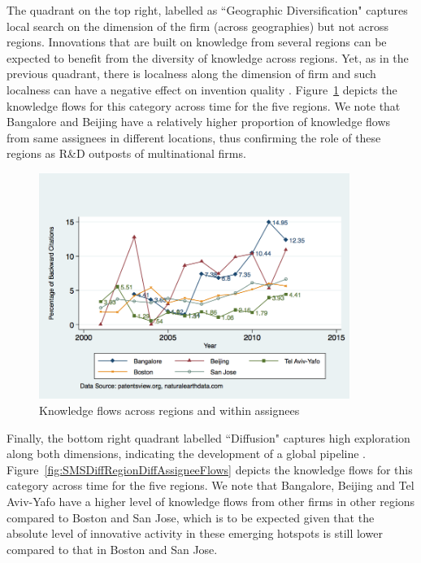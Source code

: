\documentclass[12pt,letterpaper]{article}
\begin{document}
The quadrant on the top right, labelled as ``Geographic Diversification" captures local search on the dimension of the firm (across geographies) but not across regions. Innovations that are built on knowledge from several regions can be expected to benefit from the diversity of knowledge across regions. Yet, as in the previous quadrant, there is localness along the dimension of firm and such localness can have a negative effect on invention quality \citep{Rosenkopf2001}. Figure~\ref{fig:SMSDiffRegionSameAssigneeFlows} depicts the  knowledge flows for this category across time for the five regions. We note that Bangalore and Beijing have a relatively higher proportion of knowledge flows from same assignees in different locations, thus confirming the role of these regions as R\&D outposts of multinational firms.\par

\begin{figure}[h!]
\begin{centering}
  \caption{Knowledge flows across regions and within assignees}
  \label{fig:SMSDiffRegionSameAssigneeFlows}
  \includegraphics[width=0.90\textwidth]{SMSDiffRegionSameAssigneeFlows}
\end{centering}
\end{figure}

Finally, the bottom right quadrant labelled ``Diffusion" captures high exploration along both dimensions, indicating the development of a global pipeline \citep*{Bathelt2004}. Figure~\ref{fig:SMSDiffRegionDiffAssigneeFlows} depicts the  knowledge flows for this category across time for the five regions. We note that Bangalore, Beijing and Tel Aviv-Yafo have a higher level of knowledge flows from other firms in other regions compared to Boston and San Jose, which is to be expected given that the absolute level of innovative activity in these emerging hotspots is still lower compared to that in Boston and San Jose. \par
\end{document}
